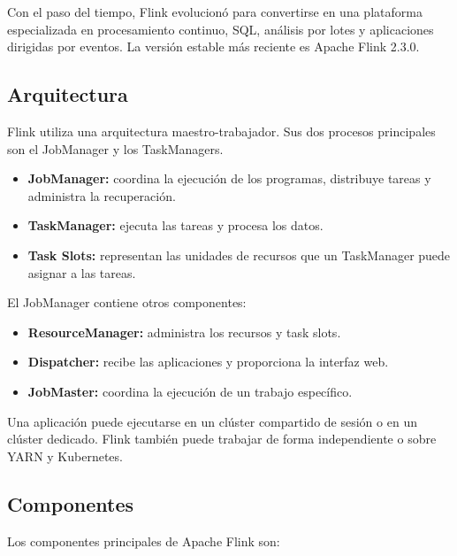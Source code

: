 Con el paso del tiempo, Flink evolucionó para convertirse en una plataforma
especializada en procesamiento continuo, SQL, análisis por lotes y
aplicaciones dirigidas por eventos. La versión estable más reciente es Apache
Flink 2.3.0.

\subsection{Arquitectura}

Flink utiliza una arquitectura maestro-trabajador. Sus dos procesos
principales son el JobManager y los TaskManagers.

\begin{itemize}
    \item \textbf{JobManager:} coordina la ejecución de los programas,
    distribuye tareas y administra la recuperación.
    
    \item \textbf{TaskManager:} ejecuta las tareas y procesa los datos.
    
    \item \textbf{Task Slots:} representan las unidades de recursos que un
    TaskManager puede asignar a las tareas.
\end{itemize}

El JobManager contiene otros componentes:

\begin{itemize}
    \item \textbf{ResourceManager:} administra los recursos y task slots.
    \item \textbf{Dispatcher:} recibe las aplicaciones y proporciona la
    interfaz web.
    \item \textbf{JobMaster:} coordina la ejecución de un trabajo específico.
\end{itemize}

Una aplicación puede ejecutarse en un clúster compartido de sesión o en un
clúster dedicado. Flink también puede trabajar de forma independiente o sobre
YARN y Kubernetes.

\subsection{Componentes}

Los componentes principales de Apache Flink son:

